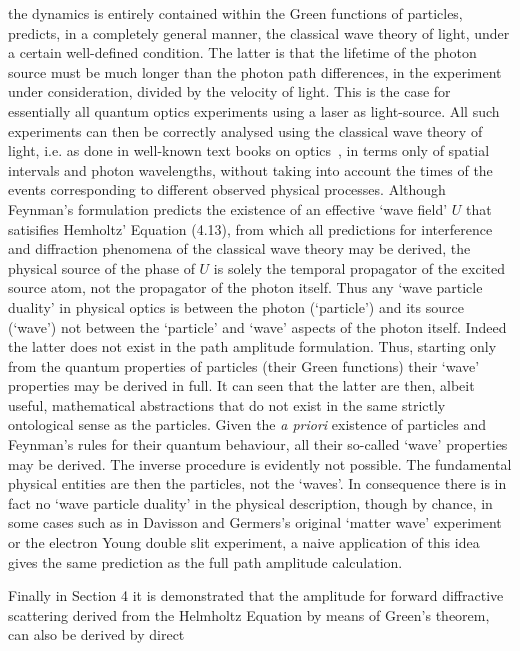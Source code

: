 \documentclass [12pt]{article}
\begin{document}
{   the dynamics is entirely contained within the Green functions of particles, predicts, in
   a completely general manner, the classical wave theory of light, under a certain well-defined
   condition. The latter is that the lifetime of the photon source must be much
    longer than the photon path differences, in the experiment under consideration,
    divided by the velocity of light. This is the case for essentially all 
   quantum optics experiments using  a laser as light-source. All such experiments
   can then be correctly analysed using the classical wave theory of light, i.e. as done in well-known
    text books on optics~\cite{BW1,MW1}, in terms only
   of spatial intervals and photon wavelengths, without taking into account the times of
    the events corresponding to different observed physical processes. 
    Although Feynman's formulation predicts the existence of an effective `wave field' $U$
    that satisifies Hemholtz' Equation (4.13), from which all predictions for interference and diffraction
   phenomena of the classical wave theory may be derived, the physical source
  of the phase of $U$ is solely the temporal propagator of the excited source atom, not the
  propagator of the photon itself. Thus any `wave particle duality' in physical optics is
  between the photon (`particle') and its source (`wave') not between the `particle' and
  `wave' aspects of the photon itself. Indeed the latter does not exist in 
   the path amplitude formulation. Thus, starting only from the quantum 
   properties of particles (their Green functions) their `wave' properties may be
    derived in full. It can seen that the latter are then, albeit useful, mathematical abstractions
  that do not exist in the same strictly ontological sense as the particles.
   Given the {\it a priori} existence of particles and Feynman's rules for their
  quantum behaviour, all their so-called `wave' properties may be derived. The inverse procedure
  is evidently not possible. The fundamental physical entities are then the particles,
  not the `waves'. In consequence there is in fact no `wave particle duality' in the physical 
  description, though by chance, in some cases such as in Davisson and Germers's original `matter wave'
  experiment~\cite{DG} or the electron Young double slit experiment, a naive application
  of this idea gives the same prediction as the full path amplitude calculation.
   \par Finally in Section 4 it is demonstrated that the amplitude for forward diffractive scattering
    derived from the Helmholtz Equation by means of Green's theorem, can also be derived by direct
}
\end{document}
